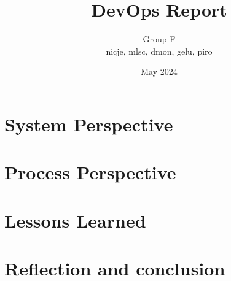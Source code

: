 \documentclass[12pt,a4paper]{report}
\title{DevOps Report}
\author{Group F \\ nicje, mlsc, dmon, gelu, piro}
\date{May 2024}
\begin{document}
\maketitle
\tableofcontents
\listoffigures

\pagebreak


\chapter{System Perspective}






\chapter{Process Perspective}








\chapter{Lessons Learned}




\chapter{Reflection and conclusion}


\end{document}
